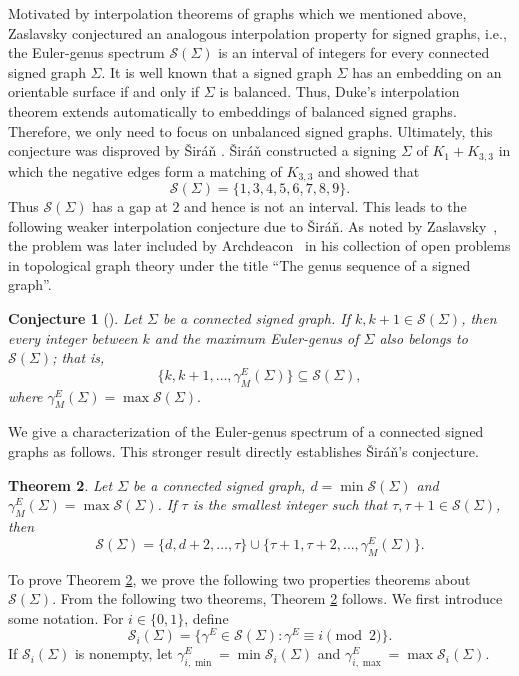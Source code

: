 \documentclass[10pt,a4paper]{amsart}
\newtheorem{theorem}{Theorem}[section]
\newtheorem{conjecture}[theorem]{Conjecture}
\newcommand{\cS}{\mathcal S}
\begin{document}
Motivated by interpolation theorems of graphs which we mentioned above, Zaslavsky \cite{Zaslavsky1992} conjectured an analogous interpolation property for signed graphs, i.e., the Euler-genus spectrum $\mathcal{S}(\Sigma)$ is an interval of integers for every connected signed graph $\Sigma$.  It is well known  that a signed graph $\Sigma$ has an embedding on an orientable surface if and only if $\Sigma$ is balanced. Thus, Duke's interpolation theorem
extends automatically to embeddings of balanced signed graphs. Therefore, we only need to focus on unbalanced signed graphs.
Ultimately, this conjecture was disproved by \v{S}ir\'a\v{n} \cite{Siran1991}. \v{S}ir\'a\v{n} constructed a signing $\Sigma$ of $K_1+K_{3,3}$ in which the negative edges form a matching of $K_{3,3}$ and showed that
\[
\cS(\Sigma)=\{1,3,4,5,6,7,8,9\}.
\]
Thus $\cS(\Sigma)$ has a gap at $2$ and hence is not an interval.
This leads to the following weaker interpolation conjecture due to \v{S}ir\'a\v{n}. As noted by
Zaslavsky~\cite{Zaslavsky1998}, the problem was later included by Archdeacon~\cite{Archdeacon1999} in his collection of open problems in topological graph theory under the title ``The genus sequence of a signed graph''.

\begin{conjecture}[\cite{Siran1991,Archdeacon1999,Zaslavsky1998}]
\label{c1:1}
Let $\Sigma$ be a connected signed graph. If
$k,k+1\in\cS(\Sigma)$, then every integer between $k$ and the maximum
Euler-genus of $\Sigma$ also belongs to $\cS(\Sigma)$; that is,
\[
\{k,k+1,\ldots,\gamma^E_M(\Sigma)\}
\subseteq \cS(\Sigma),
\]
where $\gamma^E_M(\Sigma)=\max\cS(\Sigma).$
\end{conjecture}

We give a  characterization of the Euler-genus spectrum of a connected signed graphs as follows. This stronger result directly establishes \v{S}ir\'{a}\v{n}'s conjecture.

\begin{theorem}\label{t1:2}
Let $\Sigma$ be a connected signed graph,
$d=\min\cS(\Sigma)$ and $\gamma^E_M(\Sigma)=\max\cS(\Sigma)$. If $\tau$ is the smallest integer such that
$\tau,\tau+1\in\cS(\Sigma)$, then
\[
\cS(\Sigma)
=
\{d,d+2,\ldots,\tau\}
\cup
\{\tau+1,\tau+2,\ldots,\gamma_M^E(\Sigma)\}.
\]
\end{theorem}

To prove Theorem \ref{t1:2}, we prove the following two properties theorems about $\cS(\Sigma)$. From the following two theorems, Theorem \ref{t1:2} follows. We first introduce some notation. For $i\in\{0,1\}$, define $$\cS_i(\Sigma)=\{\gamma^E\in\cS(\Sigma):\gamma^E\equiv i\pmod2\}.$$ If $\cS_i(\Sigma)$ is nonempty, let $\gamma_{i,\min}^E=\min\cS_i(\Sigma)$ and $\gamma_{i,\max}^E=\max\cS_i(\Sigma)$.
\end{document}
